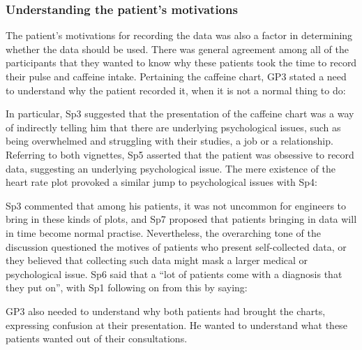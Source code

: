 \documentclass{sigchi}
\begin{document}
\subsubsection{Understanding the patient's motivations}

The patient's motivations for recording the data was also a factor in determining whether the data should be used. There was general agreement among all of the participants that they wanted to know why these patients took the time to record their pulse and caffeine intake. Pertaining the caffeine chart, GP3 stated a need to understand why the patient recorded it, when it is not a normal thing to do:


In particular, Sp3 suggested that the presentation of the caffeine chart was a way of indirectly telling him that there are underlying psychological issues, such as being overwhelmed and struggling with their studies, a job or a relationship. Referring to both vignettes, Sp5 asserted that the patient was obsessive to record  data, suggesting an underlying psychological issue. The mere existence of the heart rate plot provoked a similar jump to psychological issues with Sp4:


Sp3 commented that among his patients, it was not uncommon for engineers to bring in these kinds of plots, and Sp7 proposed that patients bringing in data will in time become normal practise. Nevertheless, the overarching tone of the discussion questioned the motives of patients who present self-collected data, or they believed that collecting such data might mask a larger medical or psychological issue. Sp6 said that a ``lot of patients come with a diagnosis that they put on'', with Sp1 following on from this by saying:


GP3 also needed to understand why both patients had brought the charts, expressing confusion at their presentation. He wanted to understand what these patients wanted out of their consultations.
\end{document}
